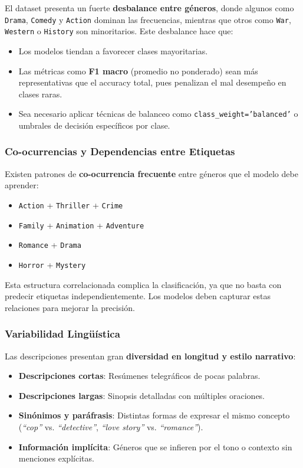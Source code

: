 El dataset presenta un fuerte \textbf{desbalance entre géneros}, donde algunos como \texttt{Drama}, \texttt{Comedy} y \texttt{Action} dominan las frecuencias, mientras que otros como \texttt{War}, \texttt{Western} o \texttt{History} son minoritarios. Este desbalance hace que:

\begin{itemize}
    \item Los modelos tiendan a favorecer clases mayoritarias.
    \item Las métricas como \textbf{F1 macro} (promedio no ponderado) sean más representativas que el accuracy total, pues penalizan el mal desempeño en clases raras.
    \item Sea necesario aplicar técnicas de balanceo como \texttt{class\_weight='balanced'} o umbrales de decisión específicos por clase.
\end{itemize}

\subsubsection{Co-ocurrencias y Dependencias entre Etiquetas}

Existen patrones de \textbf{co-ocurrencia frecuente} entre géneros que el modelo debe aprender:
\begin{itemize}
    \item \texttt{Action} + \texttt{Thriller} + \texttt{Crime}
    \item \texttt{Family} + \texttt{Animation} + \texttt{Adventure}
    \item \texttt{Romance} + \texttt{Drama}
    \item \texttt{Horror} + \texttt{Mystery}
\end{itemize}

Esta estructura correlacionada complica la clasificación, ya que no basta con predecir etiquetas independientemente. Los modelos deben capturar estas relaciones para mejorar la precisión.

\subsubsection{Variabilidad Lingüística}

Las descripciones presentan gran \textbf{diversidad en longitud y estilo narrativo}:
\begin{itemize}
    \item \textbf{Descripciones cortas}: Resúmenes telegráficos de pocas palabras.
    \item \textbf{Descripciones largas}: Sinopsis detalladas con múltiples oraciones.
    \item \textbf{Sinónimos y paráfrasis}: Distintas formas de expresar el mismo concepto (\emph{``cop''} vs. \emph{``detective''}, \emph{``love story''} vs. \emph{``romance''}).
    \item \textbf{Información implícita}: Géneros que se infieren por el tono o contexto sin menciones explícitas.
\end{itemize}


